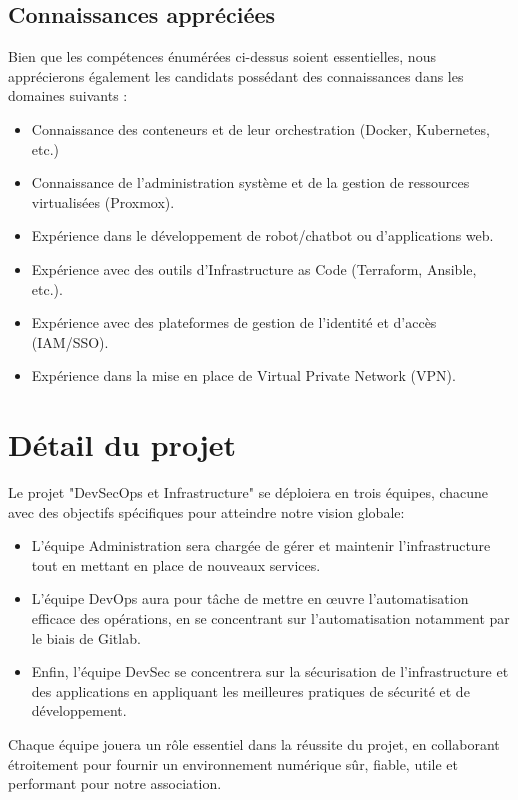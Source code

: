 \documentclass[12pt]{article}
\begin{document}
	\subsection{Connaissances appréciées}
	Bien que les compétences énumérées ci-dessus soient essentielles, nous apprécierons également les candidats possédant des connaissances dans les domaines suivants :
	\begin{itemize}
		\setlength\itemsep{0pt}
		\item Connaissance des conteneurs et de leur orchestration (Docker, Kubernetes, etc.)
		\item Connaissance de l'administration système et de la gestion de ressources virtualisées (Proxmox).
		\item Expérience dans le développement de robot/chatbot ou d'applications web.
		\item Expérience avec des outils d'Infrastructure as Code (Terraform, Ansible, etc.).
		\item Expérience avec des plateformes de gestion de l'identité et d'accès (IAM/SSO).
		\item Expérience dans la mise en place de Virtual Private Network (VPN).
	\end{itemize}
	
	\section{Détail du projet}
	Le projet "DevSecOps et Infrastructure" se déploiera en trois équipes, chacune avec des objectifs spécifiques pour atteindre notre vision globale:
	\begin{itemize}
		\item L'équipe Administration sera chargée de gérer et maintenir l'infrastructure tout en mettant en place de nouveaux services. 
		\item L'équipe DevOps aura pour tâche de mettre en œuvre l'automatisation efficace des opérations, en se concentrant sur l'automatisation notamment par le biais de Gitlab. 
		\item Enfin, l'équipe DevSec se concentrera sur la sécurisation de l'infrastructure et des applications en appliquant les meilleures pratiques de sécurité et de développement. 
	\end{itemize}
	
	\noindent Chaque équipe jouera un rôle essentiel dans la réussite du projet, en collaborant étroitement pour fournir un environnement numérique sûr, fiable, utile et performant pour notre association.
	
\end{document}
